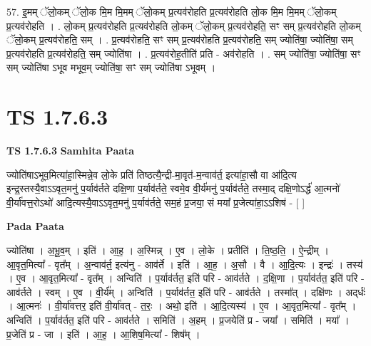 \documentclass[17pt]{extarticle}
\begin{document}
57. इ॒मम् ॅलो॒कम् ॅलो॒क मि॒म मि॒मम् ॅलो॒कम् प्र॒त्यव॑रोहति प्र॒त्यव॑रोहति लो॒क मि॒म मि॒मम् ॅलो॒कम् प्र॒त्यव॑रोहति । . लो॒कम् प्र॒त्यव॑रोहति प्र॒त्यव॑रोहति लो॒कम् ॅलो॒कम् प्र॒त्यव॑रोहति॒ सꣳ सम् प्र॒त्यव॑रोहति लो॒कम् ॅलो॒कम् प्र॒त्यव॑रोहति॒ सम् । . प्र॒त्यव॑रोहति॒ सꣳ सम् प्र॒त्यव॑रोहति प्र॒त्यव॑रोहति॒ सम् ज्योति॑षा॒ ज्योति॑षा॒ सम् प्र॒त्यव॑रोहति प्र॒त्यव॑रोहति॒ सम् ज्योति॑षा । . प्र॒त्यव॑रोह॒तीति॑ प्रति - अव॑रोहति । . सम् ज्योति॑षा॒ ज्योति॑षा॒ सꣳ सम् ज्योति॑षा ऽभूव मभूव॒म् ज्योति॑षा॒ सꣳ सम् ज्योति॑षा ऽभूवम् । \newline
\pagebreak
{}

\section{ TS 1.7.6.3 }

\textbf{TS 1.7.6.3 } \newline
\textbf{Samhita Paata} \newline

ज्योति॑षाऽभूव॒मित्या॑हा॒स्मिन्ने॒व लो॒के प्रति॑ तिष्ठत्यै॒न्द्री-मा॒वृत॑-म॒न्वाव॑र्त॒ इत्या॑हा॒सौ वा आ॑दि॒त्य इन्द्र॒स्तस्यै॒वाऽऽवृत॒मनु॑ प॒र्याव॑र्तते दक्षि॒णा प॒र्याव॑र्तते॒ स्वमे॒व वी॒र्य॑मनु॑ प॒र्याव॑र्तते॒ तस्मा॒द् दक्षि॒णोऽर्द्ध॑ आ॒त्मनो॑ वी॒र्या॑वत्त॒रोऽथो॑ आदि॒त्यस्यै॒वाऽऽवृत॒मनु॑ प॒र्याव॑र्तते॒ सम॒हं प्र॒जया॒ सं मया᳚ प्र॒जेत्या॑हा॒ऽऽशिष॑ - [ ] \newline

\textbf{Pada Paata} \newline

ज्योति॑षा । अ॒भू॒व॒म् । इति॑ । आ॒ह॒ । अ॒स्मिन्न् । ए॒व । लो॒के । प्रतीति॑ । ति॒ष्ठ॒ति॒ । ऐ॒न्द्रीम् । आ॒वृत॒मित्या᳚ - वृत᳚म् । अ॒न्वाव॑र्त॒ इत्य॑नु - आव॑र्ते । इति॑ । आ॒ह॒ । अ॒सौ । वै । आ॒दि॒त्यः । इन्द्रः॑ । तस्य॑ । ए॒व । आ॒वृत॒मित्या᳚ - वृत᳚म् । अन्विति॑ । प॒र्याव॑र्तत॒ इति॑ परि - आव॑र्तते । द॒क्षि॒णा । प॒र्याव॑र्तत॒ इति॑ परि - आव॑र्तते । स्वम् । ए॒व । वी॒र्य᳚म् । अन्विति॑ । प॒र्याव॑र्तत॒ इति॑ परि - आव॑र्तते । तस्मा᳚त् । दक्षि॑णः । अद्‌र्धः॑ । आ॒त्मनः॑ । वी॒र्या॑वत्तर॒ इति॑ वी॒र्या॑वत् - त॒रः॒ । अथो॒ इति॑ । आ॒दि॒त्यस्य॑ । ए॒व । आ॒वृत॒मित्या᳚ - वृत᳚म् । अन्विति॑ । प॒र्याव॑र्तत॒ इति॑ परि - आव॑र्तते । समिति॑ । अ॒हम् । प्र॒जयेति॑ प्र - जया᳚ । समिति॑ । मया᳚ । प्र॒जेति॑ प्र - जा । इति॑ । आ॒ह॒ । आ॒शिष॒मित्या᳚ - शिष᳚म् ।  \newline
\end{document}
